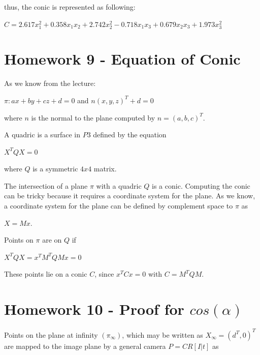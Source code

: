 \documentclass[]{article}
\begin{document}
\vspace{0.5em}

thus, the conic is represented as following:

\vspace{0.5em}

\centerline {
	$C = 2.617x_1^2 + 0.358x_1x_2 + 2.742x_2^2 - 0.718x_1x_3 + 0.679x_2x_3 + 1.973x_3^2$
}

\section{Homework 9 - Equation of Conic}

As we know from the lecture: 

\vspace{0.5em}

\centerline {
	$\pi : ax + by + cz + d = 0$ and $n(x,y,z)^T + d = 0$
}

\vspace{0.5em}

where  $n$ is the normal to the plane computed by $n=(a,b,c)^T$. 

A quadric is a surface in $P3$ defined by the equation 
 
\centerline {
	$X^TQX = 0$
}

where $Q$ is a symmetric $4x4$ matrix. 

The intersection of a plane $\pi$ with a quadric $Q$ is a conic. Computing the conic can be tricky because it requires a coordinate system for the plane. As we know, a coordinate system for the plane can be defined by complement space to $\pi$ as 

\centerline {
	$X= Mx$. 
}

Points on $\pi$ are on $Q$ if 

\vspace{0.5em}

\centerline {
	$X^TQX = x^TM^TQMx = 0$
}

\vspace{0.5em}

These points lie on a conic $C$, since $x^TCx = 0$ with $C = M^TQM$.
\section{Homework 10 - Proof for $cos(\alpha)$}  

Points on the plane at infinity $(\pi _ \infty)$, which may be written as $X_ \infty = (d^T, 0)^T$ are mapped to the image plane by a general camera $P = CR[I|t]$ as 
\end{document}
